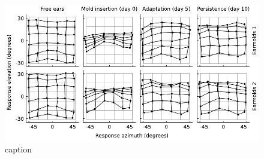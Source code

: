  \begin{figure}[hb]
	\includegraphics[width=16cm, left]{../Results/figures/fig8/fig8}
	\caption{caption}
        \label{fig:first}
\end{figure}

